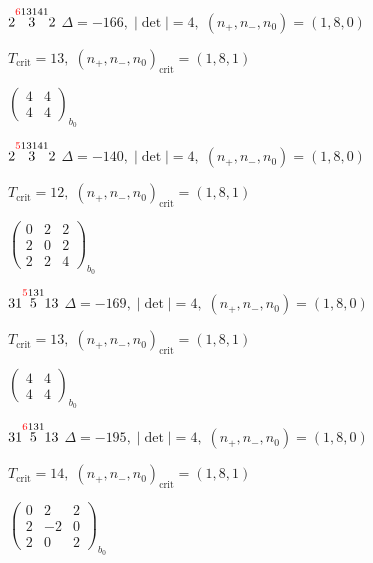 \documentclass[10pt]{article}
\begin{document}
\smallskip

$2\overset{\textcolor{red}{6}13141}{3}2$ \quad $\Delta=-166,\; |\det|=4,\; (n_+,n_-,n_0)=(1,8,0)$

\hspace{1em}$T_{\text{crit}}=13,\; (n_+,n_-,n_0)_{\text{crit}}=(1,8,1)$

\hspace{2em}$\left(\begin{smallmatrix}4 & 4 \\ 4 & 4\end{smallmatrix}\right)_{\!b_0}$

$2\overset{\textcolor{red}{5}13141}{3}2$ \quad $\Delta=-140,\; |\det|=4,\; (n_+,n_-,n_0)=(1,8,0)$

\hspace{1em}$T_{\text{crit}}=12,\; (n_+,n_-,n_0)_{\text{crit}}=(1,8,1)$

\hspace{2em}$\left(\begin{smallmatrix}0 & 2 & 2 \\ 2 & 0 & 2 \\ 2 & 2 & 4\end{smallmatrix}\right)_{\!b_0}$

\smallskip

$31\overset{\textcolor{red}{5}131}{5}13$ \quad $\Delta=-169,\; |\det|=4,\; (n_+,n_-,n_0)=(1,8,0)$

\hspace{1em}$T_{\text{crit}}=13,\; (n_+,n_-,n_0)_{\text{crit}}=(1,8,1)$

\hspace{2em}$\left(\begin{smallmatrix}4 & 4 \\ 4 & 4\end{smallmatrix}\right)_{\!b_0}$

$31\overset{\textcolor{red}{6}131}{5}13$ \quad $\Delta=-195,\; |\det|=4,\; (n_+,n_-,n_0)=(1,8,0)$

\hspace{1em}$T_{\text{crit}}=14,\; (n_+,n_-,n_0)_{\text{crit}}=(1,8,1)$

\hspace{2em}$\left(\begin{smallmatrix}0 & 2 & 2 \\ 2 & -2 & 0 \\ 2 & 0 & 2\end{smallmatrix}\right)_{\!b_0}$
\end{document}
